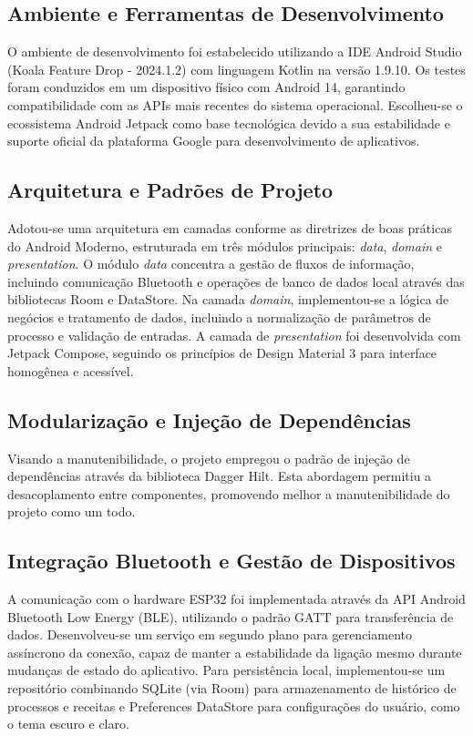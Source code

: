 \subsection{Ambiente e Ferramentas de Desenvolvimento}

O ambiente de desenvolvimento foi estabelecido utilizando a IDE Android Studio (Koala Feature Drop - 2024.1.2) com linguagem Kotlin na versão 1.9.10. Os testes foram conduzidos em um dispositivo físico com Android 14, garantindo compatibilidade com as APIs mais recentes do sistema operacional. Escolheu-se o ecossistema Android Jetpack como base tecnológica devido a sua estabilidade e suporte oficial da plataforma Google para desenvolvimento de aplicativos.

\subsection{Arquitetura e Padrões de Projeto}

Adotou-se uma arquitetura em camadas conforme as diretrizes de boas práticas do Android Moderno, estruturada em três módulos principais: \textit{data}, \textit{domain} e \textit{presentation}. O módulo \textit{data} concentra a gestão de fluxos de informação, incluindo comunicação Bluetooth e operações de banco de dados local através das bibliotecas Room e DataStore. Na camada \textit{domain}, implementou-se a lógica de negócios e tratamento de dados, incluindo a normalização de parâmetros de processo e validação de entradas. A camada de \textit{presentation} foi desenvolvida com Jetpack Compose, seguindo os princípios de Design Material 3 para interface homogênea e acessível.

\subsection{Modularização e Injeção de Dependências}

Visando a manutenibilidade, o projeto empregou o padrão de injeção de dependências através da biblioteca Dagger Hilt. Esta abordagem permitiu a desacoplamento entre componentes, promovendo melhor a manutenibilidade do projeto como um todo. 

\subsection{Integração Bluetooth e Gestão de Dispositivos}

A comunicação com o hardware ESP32 foi implementada através da API Android Bluetooth Low Energy (BLE), utilizando o padrão GATT para transferência de dados. Desenvolveu-se um serviço em segundo plano para gerenciamento assíncrono da conexão, capaz de manter a estabilidade da ligação mesmo durante mudanças de estado do aplicativo. Para persistência local, implementou-se um repositório combinando SQLite (via Room) para armazenamento de histórico de processos e receitas e Preferences DataStore para configurações do usuário, como o tema escuro e claro.

